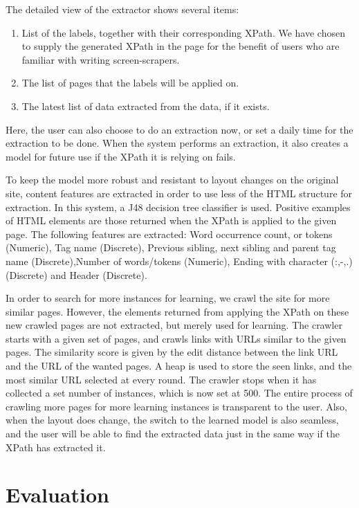 \documentclass[a4paper,12pt]{nurop}
\begin{document}
 The detailed view of the extractor shows several items:
 \begin{enumerate}
 	\item List of the labels, together with their corresponding XPath.
 	We have chosen to supply the generated XPath in the page for the benefit
	of users who are familiar with writing screen-scrapers.
 	\item The list of pages that the labels will be applied on.
 	\item The latest list of data extracted from the data, if it exists.
 \end{enumerate}

Here, the user can also choose to do an extraction now, or set a daily time for the extraction
to be done. When the system performs an extraction, it also creates a model for future use if
the XPath it is relying on fails.

To keep the model more robust and resistant to layout changes on the original site,
content features are extracted in order to use less of the HTML structure for extraction.
In this system, a J48 decision tree classifier is used. Positive examples of HTML elements
are those returned when the XPath is applied to the given page. The following features are extracted:
Word occurrence count, or tokens (Numeric), Tag name (Discrete),
Previous sibling, next sibling and parent tag name (Discrete),Number of words/tokens (Numeric),
Ending with character (:,-,.) (Discrete) and Header (Discrete).

In order to search for more instances for learning, we crawl the site for more similar pages.
However, the elements returned from applying the XPath on these new crawled pages are not extracted,
but merely used for learning. The crawler starts with a given set of pages, and crawls links with URLs similar
to the given pages. The similarity score is given by the edit distance between the link URL
and the URL of the wanted pages. A heap is used to store the seen links, and the most similar
URL selected at every round. The crawler stops when it has collected a set number of instances,
which is now set at 500. The entire process of crawling more pages for more learning instances is transparent to the user.
Also, when the layout does change, the switch to the learned model is also seamless, and the 
user will be able to find the extracted data just in the same way if the XPath has extracted it.

\section{Evaluation}
\end{document}
